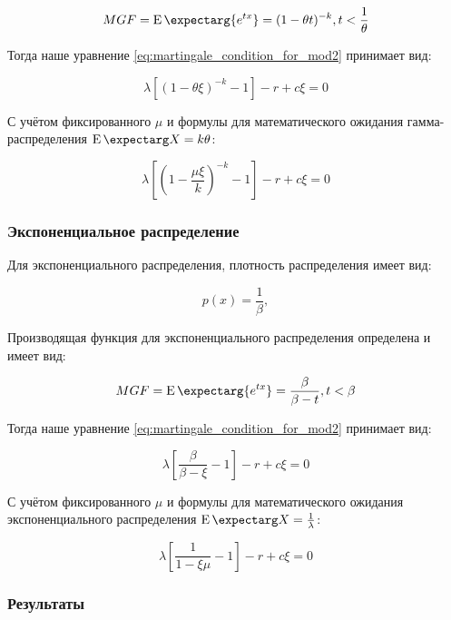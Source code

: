 \documentclass[a4paper,12pt]{article}
\theoremstyle{definition}
\newcommand{\expect}{\operatorname{E}\expectarg}
\begin{document}
\begin{equation}
    MGF = \expect{e^{t x}} = (1 - \theta t)^{-k}, t < \frac{1}{\theta}
\end{equation}

Тогда наше уравнение \eqref{eq:martingale_condition_for_mod2} принимает вид:

\begin{equation*}
    \lambda \left[ (1 - \theta \xi)^{-k} - 1 \right] - r + c \xi = 0
\end{equation*}

С учётом фиксированного $\mu$ и формулы для математического ожидания гамма-распределения $\expect X = k \theta$:

\begin{equation*}
    \lambda \left[ \left(1 - \frac{\mu \xi}{k}\right)^{-k} - 1 \right] - r + c \xi = 0
\end{equation*}

\subsubsection{Экспоненциальное распределение}

Для экспоненциального распределения, плотность распределения имеет вид:

\begin{equation}
    p(x) = \frac{1}{\beta},
\end{equation}

Производящая функция для экспоненциального распределения определена и имеет вид:

\begin{equation}
    MGF = \expect{e^{t x}} = \frac{\beta}{\beta - t}, t < \beta
\end{equation}

Тогда наше уравнение \eqref{eq:martingale_condition_for_mod2} принимает вид:

\begin{equation*}
    \lambda \left[ \frac{\beta}{\beta - \xi} - 1 \right] - r + c \xi = 0
\end{equation*}

С учётом фиксированного $\mu$ и формулы для математического ожидания экспоненциального распределения $\expect X = \frac{1}{\lambda}$:

\begin{equation*}
    \lambda \left[ \frac{1}{1 - \xi \mu} - 1 \right] - r + c \xi = 0
\end{equation*}

\subsubsection{Результаты}
\end{document}
